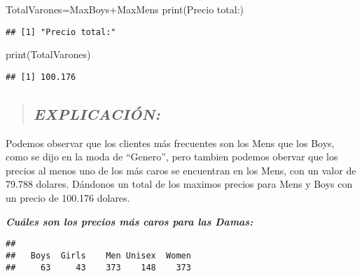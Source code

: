 \documentclass[
]{article}
\newenvironment{Shaded}{\begin{snugshade}}{\end{snugshade}}
\newcommand{\FunctionTok}[1]{\textcolor[rgb]{0.00,0.00,0.00}{#1}}
\newcommand{\NormalTok}[1]{#1}
\newcommand{\OtherTok}[1]{\textcolor[rgb]{0.56,0.35,0.01}{#1}}
\newcommand{\SpecialCharTok}[1]{\textcolor[rgb]{0.00,0.00,0.00}{#1}}
\newcommand{\StringTok}[1]{\textcolor[rgb]{0.31,0.60,0.02}{#1}}
\begin{document}
\begin{Shaded}
\begin{Highlighting}[]
\NormalTok{TotalVarones}\OtherTok{=}\NormalTok{MaxBoys}\SpecialCharTok{+}\NormalTok{MaxMens}
\FunctionTok{print}\NormalTok{(}\StringTok{\textquotesingle{}Precio total:\textquotesingle{}}\NormalTok{)}
\end{Highlighting}
\end{Shaded}

\begin{verbatim}
## [1] "Precio total:"
\end{verbatim}

\begin{Shaded}
\begin{Highlighting}[]
\FunctionTok{print}\NormalTok{(TotalVarones)}
\end{Highlighting}
\end{Shaded}

\begin{verbatim}
## [1] 100.176
\end{verbatim}

\begin{quote}
\hypertarget{explicaciuxf3n-8}{%
\subsection{\texorpdfstring{\textbf{\emph{EXPLICACIÓN:}}}{EXPLICACIÓN:}}\label{explicaciuxf3n-8}}
\end{quote}

Podemos observar que los clientes más frecuentes son los Mens que los
Boys, como se dijo en la moda de ``Genero'', pero tambien podemos
obervar que los precios al menos uno de los más caros se encuentran en
los Mens, con un valor de 79.788 dolares. Dándonos un total de los
maximos precios para Mens y Boys con un precio de 100.176 dolares.

\textbf{\emph{Cuáles son los precios más caros para las Damas:}}

\begin{Shaded}
\end{Shaded}

\begin{verbatim}
## 
##   Boys  Girls    Men Unisex  Women 
##     63     43    373    148    373
\end{verbatim}
\end{document}
